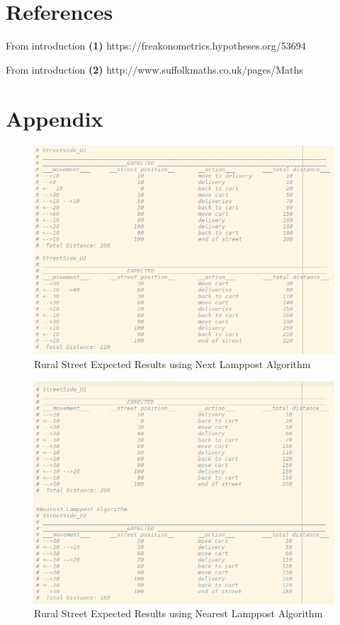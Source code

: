 \documentclass[14pt]{article}
\begin{document}
\section{References}
From introduction \textbf{(1)} https://freakonometrics.hypotheses.org/53694

From introduction \textbf{(2)} http://www.suffolkmaths.co.uk/pages/Maths%

\section{Appendix}
\begin{figure}[H]
\centering
\includegraphics[width = 430pt]{Images/UrbanStreetExpectedResultsNextLampPost.png}
\caption{Rural Street Expected Results using Next Lamppost Algorithm}
\label{fig:rural street expected results using next lamppost algorithm}
\end{figure}

\begin{figure}[H]
\centering
\includegraphics[width = 430pt]{Images/UrbanStreetExpectedResultsNearestLampPost.png}
\caption{Rural Street Expected Results using Nearest Lamppost Algorithm}
\label{fig:rural street expected results using nearest lamppost algorithm}
\end{figure}
\end{document}
